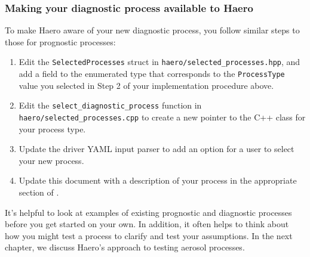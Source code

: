 \subsubsection{Making your diagnostic process available to Haero}

To make Haero aware of your new diagnostic process, you follow similar steps
to those for prognostic processes:

\begin{enumerate}
  \item Edit the \texttt{SelectedProcesses} struct in
        \texttt{haero/selected\_processes.hpp}, and add a field to the enumerated
        type that corresponds to the \texttt{ProcessType} value you selected in
        Step 2 of your implementation procedure above.
  \item Edit the \texttt{select\_diagnostic\_process} function in
        \texttt{haero/selected\_processes.cpp} to create a new pointer to the C++
        class for your process type.
  \item Update the driver YAML input parser to add an option for a user
        to select your new process.
  \item Update this document with a description of your process in the
        appropriate section of .
\end{enumerate}

It's helpful to look at examples of existing prognostic and diagnostic
processes before you get started on your own. In addition, it often helps to
think about how you might test a process to clarify and test your assumptions.
In the next chapter, we discuss Haero's approach to testing aerosol processes.
